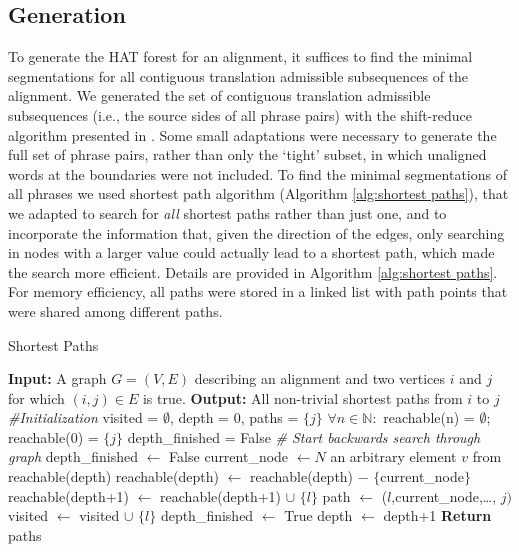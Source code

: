 \subsection{Generation}
To generate the HAT forest for an alignment, it suffices to find the minimal segmentations for all contiguous translation admissible subsequences of the alignment. We generated the set of contiguous translation admissible subsequences (i.e., the source sides of all phrase pairs) with the shift-reduce algorithm presented in \cite{zhang2008extracting}. Some small adaptations were necessary to generate the full set of phrase pairs, rather than only the `tight' subset, in which unaligned words at the boundaries were not included. To find the minimal segmentations of all phrases we used  shortest path algorithm (Algorithm \ref{alg:shortest paths}), that we adapted to search for \textit{all} shortest paths rather than just one, and to incorporate the information that, given the direction of the edges, only searching in nodes with a larger value could actually lead to a shortest path, which made the search more efficient. Details are provided in Algorithm \ref{alg:shortest paths}. For memory efficiency, all paths were stored in a linked list with path points that were shared among different paths.

\begin{algorithm}
\caption{Shortest Paths}\label{alg:shortest paths}
\begin{algorithmic}
\STATE \textbf{Input:} A graph $G = (V,E)$ describing an alignment and two vertices $i$ and $j$ for which $(i,j)\in E$ is true.
\STATE \textbf{Output:} All non-trivial shortest paths from $i$ to $j$
\STATE \textit{\#Initialization}
\STATE visited = $\emptyset$, depth = $0$, paths = $\{j\}$
\STATE $\forall n\in\mathbb{N}:$ reachable(n) = $\emptyset$; reachable($0$) = $\{j\}$
\STATE depth\_finished = False
\STATE \textit{\# Start backwards search through graph}
		\STATE depth\_finished $\leftarrow$ False
		\STATE current\_node $\leftarrow N$ an arbitrary element $v$ from reachable(depth)
		\STATE reachable(depth) $\leftarrow$ reachable(depth) $-$ $\{$current\_node$\}$
				\STATE reachable(depth+1) $\leftarrow$ reachable(depth+1) $\cup$ $\{l\}$
					\STATE path $\leftarrow$ ($l$,current\_node,\ldots, $j)$
				\ENDFOR
			\ENDIF
		\STATE visited $\leftarrow$ visited $\cup$ $\{l\}$
		\ENDFOR
	\STATE depth\_finished $\leftarrow$ True
	\STATE depth $\leftarrow$ depth+1
	\ENDWHILE
\ENDWHILE
\STATE \textbf{Return} paths
\end{algorithmic}
\end{algorithm}


